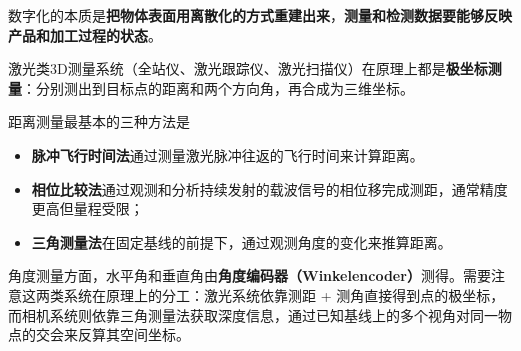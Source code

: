 数字化的本质是\textbf{把物体表面用离散化的方式重建出来}，\textbf{测量和检测数据要能够反映产品和加工过程的状态}。

激光类3D测量系统（全站仪、激光跟踪仪、激光扫描仪）在原理上都是\textbf{极坐标测量}：分别测出到目标点的距离和两个方向角，再合成为三维坐标。

距离测量最基本的三种方法是
\begin{itemize}
    \item \textbf{脉冲飞行时间法}通过测量激光脉冲往返的飞行时间来计算距离。
    \item \textbf{相位比较法}通过观测和分析持续发射的载波信号的相位移完成测距，通常精度更高但量程受限；
    \item \textbf{三角测量法}在固定基线的前提下，通过观测角度的变化来推算距离。
\end{itemize}
角度测量方面，水平角和垂直角由\textbf{角度编码器（Winkelencoder）}测得。需要注意这两类系统在原理上的分工：激光系统依靠测距 + 测角直接得到点的极坐标，而相机系统则依靠三角测量法获取深度信息，通过已知基线上的多个视角对同一物点的交会来反算其空间坐标。